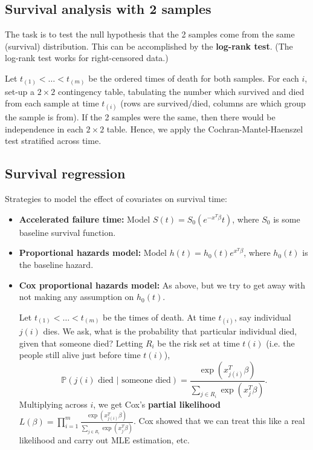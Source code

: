 \documentclass[twoside]{article}
\newcommand\bbP{\mathbb{P}}
\begin{document}
\subsection{Survival analysis with 2 samples}
The task is to test the null hypothesis that the 2 samples come from the same (survival) distribution. This can be accomplished by the \textbf{log-rank test}. (The log-rank test works for right-censored data.)

Let $t_{(1)} < \dots < t_{(m)}$ be the ordered times of death for both samples. For each $i$, set-up a $2 \times 2$ contingency table, tabulating the number which survived and died from each sample at time $t_{(i)}$ (rows are survived/died, columns are which group the sample is from). If the 2 samples were the same, then there would be independence in each $2 \times 2$ table. Hence, we apply the Cochran-Mantel-Haenszel test stratified across time.

\subsection{Survival regression}
Strategies to model the effect of covariates on survival time:
\begin{itemize}
\item \textbf{Accelerated failure time:} Model $S(t) = S_0 \left( e^{-x^T \beta} t \right)$, where $S_0$ is some baseline survival function.

\item \textbf{Proportional hazards model:} Model $h(t) = h_0(t) e^{x^T \beta}$, where $h_0(t)$ is the baseline hazard.

\item \textbf{Cox proportional hazards model:} As above, but we try to get away with not making any assumption on $h_0(t)$.

Let $t_{(1)}< \dots < t_{(m)}$ be the times of death. At time $t_{(i)}$, say individual $j(i)$ dies. We ask, what is the probability that particular individual died, given that someone died? Letting $R_i$ be the risk set at time $t(i)$ (i.e. the people still alive just before time $t(i)$),
\begin{equation*}
\bbP (j(i) \text{ died } | \text{ someone died}) = \frac{\exp \left( x_{j(i)}^T \beta \right)}{\sum_{j \in R_i} \exp \left( x_j^T \beta \right)}.
\end{equation*}
Multiplying across $i$, we get Cox's \textbf{partial likelihood} $L(\beta) = \displaystyle\prod_{i=1}^m \frac{\exp \left( x_{j(i)}^T \beta \right)}{\sum_{j \in R_i} \exp \left( x_j^T \beta \right)}$. Cox showed that we can treat this like a real likelihood and carry out MLE estimation, etc.
\end{itemize}
\end{document}
